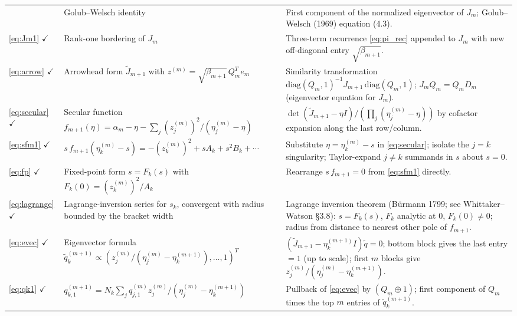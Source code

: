 \documentclass{article}
\begin{document}
\begin{longtable}{@{}p{}p{}p{}@{}}
  & Golub--Welsch identity
  & First component of the normalized eigenvector of $J_m$;
    Golub--Welsch (1969) equation (4.3). \\
\addlinespace
%
\eqref{eq:Jm1} $\checkmark$
  & Rank-one bordering of $J_m$
  & Three-term recurrence \eqref{eq:pi_rec} appended to $J_m$
    with new off-diagonal entry $\sqrt{\beta_{m+1}}$. \\
\addlinespace
%
\eqref{eq:arrow} $\checkmark$
  & Arrowhead form $\widetilde{J}_{m+1}$ with
    $z^{(m)}=\sqrt{\beta_{m+1}}\,Q_m^T e_m$
  & Similarity transformation $\mathrm{diag}(Q_m,1)^{-1}
    J_{m+1}\,\mathrm{diag}(Q_m,1)$; $J_m Q_m = Q_m D_m$
    (eigenvector equation for $J_m$). \\
\addlinespace
%
\eqref{eq:secular} $\checkmark$
  & Secular function $f_{m+1}(\eta) = \alpha_m - \eta
    - \sum_j(z_j^{(m)})^2/(\eta_j^{(m)}-\eta)$
  & $\det(\widetilde{J}_{m+1}-\eta I)/(\prod_j(\eta_j^{(m)}-\eta))$
    by cofactor expansion along the last row/column. \\
\addlinespace
%
\eqref{eq:sfm1} $\checkmark$
  & $s\,f_{m+1}(\eta_k^{(m)}-s)
    = -(z_k^{(m)})^2 + sA_k + s^2B_k + \cdots$
  & Substitute $\eta=\eta_k^{(m)}-s$ in \eqref{eq:secular};
    isolate the $j=k$ singularity; Taylor-expand $j\ne k$
    summands in $s$ about $s=0$. \\
\addlinespace
%
\eqref{eq:fp} $\checkmark$
  & Fixed-point form $s = F_k(s)$ with $F_k(0)=(z_k^{(m)})^2/A_k$
  & Rearrange $s\,f_{m+1}=0$ from \eqref{eq:sfm1} directly. \\
\addlinespace
%
\eqref{eq:lagrange} $\checkmark$
  & Lagrange-inversion series for $s_k$, convergent with radius
    bounded by the bracket width
  & Lagrange inversion theorem (B\"urmann 1799; see Whittaker--Watson
    \S3.8): $s=F_k(s)$, $F_k$ analytic at $0$, $F_k(0)\ne 0$;
    radius from distance to nearest other pole of $f_{m+1}$. \\
\addlinespace
%
\eqref{eq:evec} $\checkmark$
  & Eigenvector formula $\widetilde{q}_k^{(m+1)}\propto
    (z_j^{(m)}/(\eta_j^{(m)}-\eta_k^{(m+1)}),\dots,1)^T$
  & $(\widetilde{J}_{m+1}-\eta_k^{(m+1)}I)\widetilde{q}=0$;
    bottom block gives the last entry $=1$ (up to scale);
    first $m$ blocks give $z_j^{(m)}/(\eta_j^{(m)}-\eta_k^{(m+1)})$. \\
\addlinespace
%
\eqref{eq:qk1} $\checkmark$
  & $q_{k,1}^{(m+1)} = N_k\sum_j q_{j,1}^{(m)}
    z_j^{(m)}/(\eta_j^{(m)}-\eta_k^{(m+1)})$
  & Pullback of \eqref{eq:evec} by $(Q_m\oplus 1)$; first
    component of $Q_m$ times the top $m$ entries of
    $\widetilde{q}_k^{(m+1)}$. \\

\end{longtable}
\end{document}
